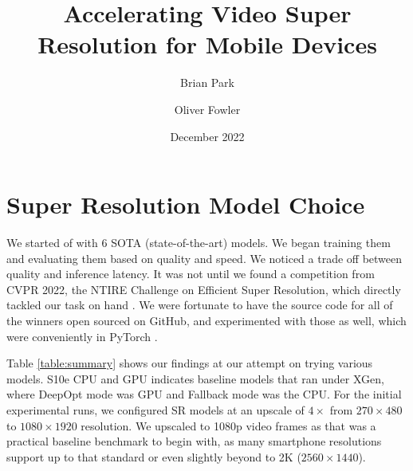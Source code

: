 \documentclass{article}
\title{Accelerating Video Super Resolution for Mobile Devices}
\author{Brian Park}
\author{Oliver Fowler}
\affil{North Carolina State University, Computer Science 591/791-025}
\date{December 2022}
\begin{document}

\maketitle

\section{Super Resolution Model Choice}

We started of with 6 SOTA (state-of-the-art) models. We began training them and evaluating them based on quality and speed. We noticed a trade off between quality and inference latency. It was not until we found a competition from CVPR 2022, the NTIRE Challenge on Efficient Super Resolution, which directly tackled our task on hand \cite{ntire22}. We were fortunate to have the source code for all of the winners open sourced on GitHub, and experimented with those as well, which were conveniently in PyTorch \cite{ntire22-github}. 

Table \ref{table:summary} shows our findings at our attempt on trying various models. S10e CPU and GPU indicates baseline models that ran under XGen, where DeepOpt mode was GPU and Fallback mode was the CPU. For the initial experimental runs, we configured SR models at an upscale of $4\times$ from $270 \times 480$ to $1080 \times 1920$ resolution. We upscaled to 1080p video frames as that was a practical baseline benchmark to begin with, as many smartphone resolutions support up to that standard or even slightly beyond to 2K ($2560 \times 1440$).
\end{document}
